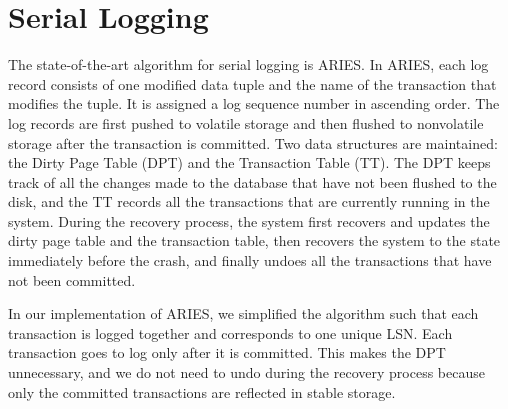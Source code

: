 \section{Serial Logging}

The state-of-the-art algorithm for serial logging is ARIES. In ARIES, each log record consists of one modified data tuple and the name of the transaction that modifies the tuple. It is assigned a log sequence number in ascending order. The log records are first pushed to volatile storage and then flushed to nonvolatile storage after the transaction is committed. Two data structures are maintained: the Dirty Page Table (DPT) and the Transaction Table (TT). The DPT keeps track of all the changes made to the database that have not been flushed to the disk, and the TT records all the transactions that are currently running in the system. During the recovery process, the system first recovers and updates the dirty page table and the transaction table, then recovers the system to the state immediately before the crash, and finally undoes all the transactions that have not been committed.\par
In our implementation of ARIES, we simplified the algorithm such that each transaction is logged together and corresponds to one unique LSN. Each transaction goes to log only after it is committed. This makes the DPT unnecessary, and we do not need to undo during the recovery process because only the committed transactions are reflected in stable storage. \par

